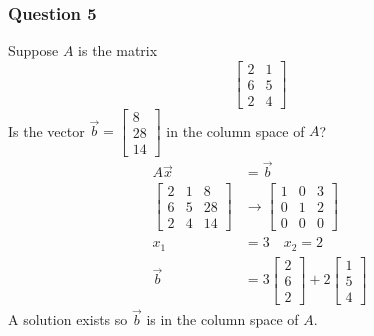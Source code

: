 \documentclass{math}
\begin{document}
\subsubsection*{Question 5}
Suppose \( A \) is the matrix
\[ \begin{bmatrix}
  2 & 1 \\
  6 & 5 \\
  2 & 4
\end{bmatrix} \]
Is the vector \( \vec{b} = \begin{bmatrix}8 \\ 28 \\ 14\end{bmatrix} \) in
the column space of \( A \)?
\begin{align*}
  A\vec{x} &= \vec{b} \\
  \left[\begin{array}{cc|c}
    2 & 1 & 8 \\
    6 & 5 & 28 \\
    2 & 4 & 14
  \end{array}\right] &\to \left[\begin{array}{cc|c}
    1 & 0 & 3 \\
    0 & 1 & 2 \\
    0 & 0 & 0
  \end{array}\right] \\
  x_1 &= 3 \quad x_2 = 2 \\
  \vec{b} &= 3\begin{bmatrix}2 \\ 6 \\ 2\end{bmatrix}+
    2\begin{bmatrix}1 \\ 5 \\ 4\end{bmatrix}
\end{align*}
A solution exists so \( \vec{b} \) is in the column space of \( A \).
\end{document}
